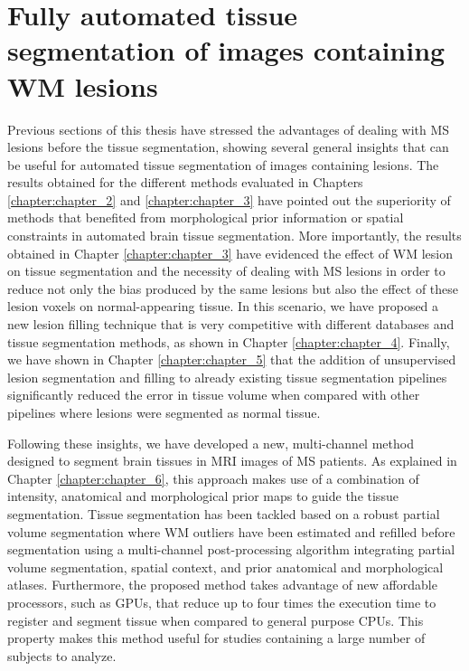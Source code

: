 \section{Fully automated tissue segmentation of images containing WM lesions}
\label{sec:label}

Previous sections of this thesis have stressed the advantages of dealing with MS lesions before the tissue segmentation, showing several general insights that can be useful for automated tissue segmentation of images containing lesions. The results obtained for the different methods evaluated in Chapters \ref{chapter:chapter_2} and \ref{chapter:chapter_3} have pointed out the superiority of methods that benefited from morphological prior information or spatial constraints in automated brain tissue segmentation. More importantly, the results obtained in Chapter \ref{chapter:chapter_3} have evidenced the effect of WM lesion on tissue segmentation and the necessity of dealing with MS lesions in order to reduce not only the bias produced by the same lesions but also the effect of these lesion voxels on normal-appearing tissue. In this scenario, we have proposed a new lesion filling technique that is very competitive with different databases and tissue segmentation methods, as shown in Chapter \ref{chapter:chapter_4}. Finally, we have shown in Chapter \ref{chapter:chapter_5} that the addition of unsupervised lesion segmentation and filling to already existing tissue segmentation pipelines significantly reduced the error in tissue volume when compared with other pipelines where lesions were segmented as normal tissue. 

Following these insights, we have developed a new, multi-channel method designed to segment brain tissues in MRI images of MS patients. As explained in Chapter \ref{chapter:chapter_6}, this approach makes use of a combination of intensity, anatomical and morphological prior maps to guide the tissue segmentation. Tissue segmentation has been tackled based on a robust partial volume segmentation where WM outliers have been estimated and refilled before segmentation using a multi-channel post-processing algorithm integrating  partial volume segmentation, spatial context, and prior anatomical and morphological atlases. Furthermore, the proposed method takes advantage of new affordable processors, such as GPUs, that reduce up to four times the execution time to register and segment tissue when compared to general purpose CPUs. This property makes this method useful for studies containing a large number of subjects to analyze.   

